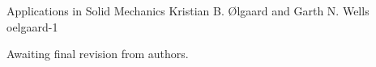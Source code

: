               {Applications in Solid Mechanics}
              {Kristian B. {\O}lgaard and Garth N. Wells}
              {oelgaard-1}

Awaiting final revision from authors.
